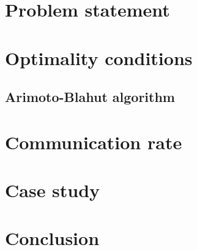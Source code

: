 \documentclass[letterpaper, 10 pt, conference]{ieeeconf}  %
\begin{document}
 






\section{Problem statement}








\section{Optimality conditions}



\subsection{Arimoto-Blahut algorithm}


\section{Communication rate}\label{sec:ab}



\section{Case study}


\section{Conclusion}




\end{document}
